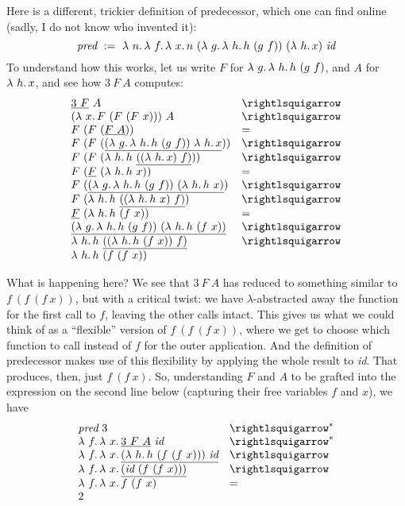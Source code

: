   Here is a different, trickier definition of predecessor, which one can find online (sadly, I do
not know who invented it):
\[
\textit{pred}\ :=\ \lam{n}{\lam{f}{\lam{x}{n\ (\lam{g}{\lam{h}{h\ (g\ f)}})\ (\lam{h}{x})\ \textit{id}}}}
\]
\noindent To understand how this works, let us write $F$ for $\lambda\ g.\, \lambda\ h.\, h\ (g\ f)$, and $A$ for $\lambda\ h.\, x$, and
see how $3\ F\ A$ computes:
\[
\begin{array}{ll}
  \underline{3\ F}\ A & \betaa \\
  (\lam{x}{F\ (F\ (F\ x))})\ A & \betaa \\
  F\ (F\ (\underline{F\ A})) & = \\
  F\ (F\ (\underline{(\lam{g}{\lam{h}{h\ (g\ f)}})\ \lam{h}{x}})) & \betaa \\  
  F\ (F\ (\lam{h}{h\ \underline{((\lam{h}{x})\ f)}})) & \betaa \\
  F\ (\underline{F}\ (\lam{h}{h\ x})) & = \\
  F\ (\underline{(\lam{g}{\lam{h}{h\ (g\ f)}})\ (\lam{h}{h\ x})}) & \betaa \\      
  F\ (\lam{h}{h\ \underline{((\lam{h}{h\ x})\ f)}}) & \betaa \\
  \underline{F}\ (\lam{h}{h\ (f\ x)}) & = \\
  \underline{(\lam{g}{\lam{h}{h\ (g\ f)}})\ (\lam{h}{h\ (f\ x)})} & \betaa \\
  \lam{h}{h\ \underline{((\lam{h}{h\ (f\ x)})\ f)}} & \betaa \\
  \lam{h}{h\ (f\ (f\ x))} & \
\end{array}
\]

What is happening here?  We see that $3\ F\ A$ has reduced to something similar to $f\ (f\ (f\ x))$, but
with a critical twist: we have $\lambda$-abstracted away the function for the first call to $f$, leaving
the other calls intact.  This gives us what we could think of as a ``flexible'' version of $f\ (f\ (f\ x))$, where we get
to choose which function to call instead of $f$ for the outer application.  And the definition of predecessor makes use of this flexibility
by applying the whole result to \textit{id}.  That produces, then, just $f\ (f\ x)$.  So, understanding $F$ and $A$ to be grafted
into the expression on the second line below (capturing their free variables $f$ and $x$), we have
\[
\begin{array}{ll}
  \textit{pred}\ 3 & \betaa^* \\
  \lam{f}{\lam{x}{\underline{3\ F\ A}\ \textit{id}}} & \betaa^* \\
  \lam{f}{\lam{x}{\underline{(\lam{h}{h\ (f\ (f\ x))})\ \textit{id}}}} & \betaa \\
  \lam{f}{\lam{x}{\underline{(\textit{id}\ (f\ (f\ x)))}}} & \betaa \\
  \lam{f}{\lam{x}{f\ (f\ x)}} & = \\  
  2 &\ 
\end{array}
\]


